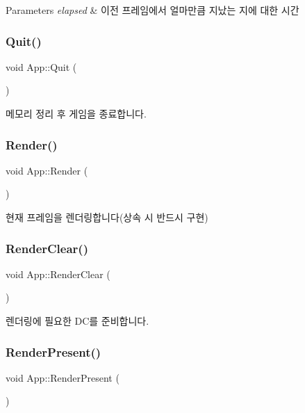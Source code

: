 \begin{DoxyParams}{Parameters}
{\em elapsed} & 이전 프레임에서 얼마만큼 지났는 지에 대한 시간 \\
\hline
\end{DoxyParams}
\mbox{\label{class_app_ad76985d9eeb1eb7cb2fa0804428bd2da}} 
\subsubsection{\texorpdfstring{Quit()}{Quit()}}
{\footnotesize\ttfamily void App\+::\+Quit (\begin{DoxyParamCaption}{ }\end{DoxyParamCaption})}

메모리 정리 후 게임을 종료합니다. \mbox{\label{class_app_a7f42e947a052412c193c689b7e7a73cc}} 
\subsubsection{\texorpdfstring{Render()}{Render()}}
{\footnotesize\ttfamily void App\+::\+Render (\begin{DoxyParamCaption}{ }\end{DoxyParamCaption})\hspace{0.3cm}{\ttfamily [virtual]}}

현재 프레임을 렌더링합니다(상속 시 반드시 구현) \mbox{\label{class_app_a37267ab01a867e0aa20b99114a1c8b08}} 
\subsubsection{\texorpdfstring{RenderClear()}{RenderClear()}}
{\footnotesize\ttfamily void App\+::\+Render\+Clear (\begin{DoxyParamCaption}{ }\end{DoxyParamCaption})}

렌더링에 필요한 D\+C를 준비합니다. \mbox{\label{class_app_a8b06af681cd1bbc4d1683b692cce6249}} 
\subsubsection{\texorpdfstring{RenderPresent()}{RenderPresent()}}
{\footnotesize\ttfamily void App\+::\+Render\+Present (\begin{DoxyParamCaption}{ }\end{DoxyParamCaption})}

